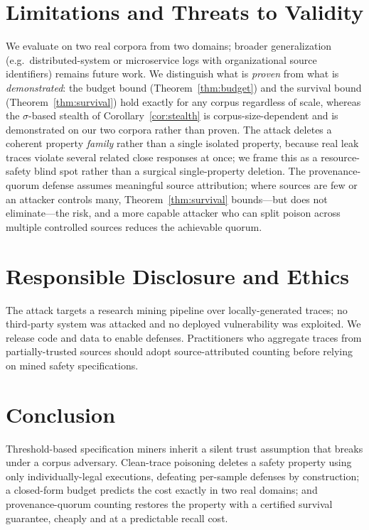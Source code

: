 \documentclass[runningheads]{llncs}
\begin{document}
\section{Limitations and Threats to Validity}\label{sec:limits}
We evaluate on two real corpora from two domains; broader generalization (e.g.\
distributed-system or microservice logs with organizational source identifiers)
remains future work. We distinguish what is \emph{proven} from what is \emph{demonstrated}: the budget bound (Theorem~\ref{thm:budget}) and the survival bound (Theorem~\ref{thm:survival}) hold exactly for any corpus regardless of scale, whereas the $\sigma$-based stealth of Corollary~\ref{cor:stealth} is corpus-size-dependent and is demonstrated on our two corpora rather than proven. The attack deletes a coherent property \emph{family} rather
than a single isolated property, because real leak traces violate several related
close responses at once; we frame this as a resource-safety blind spot rather than
a surgical single-property deletion. The provenance-quorum defense assumes
meaningful source attribution; where sources are few or an attacker controls many,
Theorem~\ref{thm:survival} bounds---but does not eliminate---the risk, and a more
capable attacker who can split poison across multiple controlled sources reduces
the achievable quorum.

\section{Responsible Disclosure and Ethics}
The attack targets a research mining pipeline over locally-generated traces; no
third-party system was attacked and no deployed vulnerability was exploited. We
release code and data to enable defenses. Practitioners who aggregate traces from
partially-trusted sources should adopt source-attributed counting before relying
on mined safety specifications.

\section{Conclusion}
Threshold-based specification miners inherit a silent trust assumption that breaks
under a corpus adversary. Clean-trace poisoning deletes a safety property using
only individually-legal executions, defeating per-sample defenses by construction;
a closed-form budget predicts the cost exactly in two real domains; and
provenance-quorum counting restores the property with a certified survival
guarantee, cheaply and at a predictable recall cost.
\end{document}
